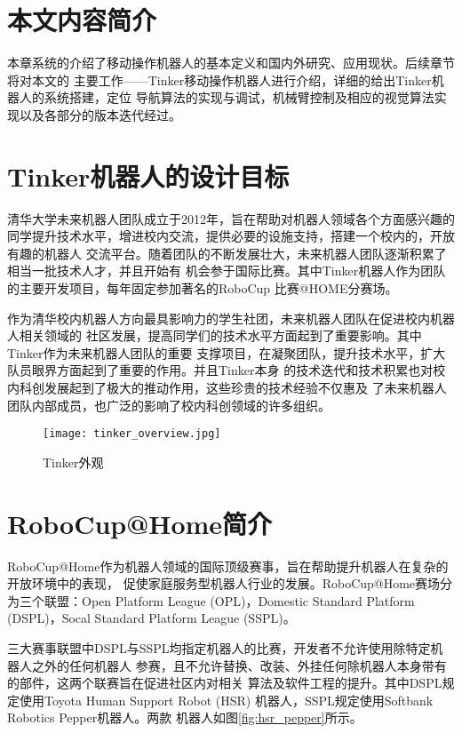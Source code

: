 \section{本文内容简介}

本章系统的介绍了移动操作机器人的基本定义和国内外研究、应用现状。后续章节将对本文的
主要工作——Tinker移动操作机器人进行介绍，详细的给出Tinker机器人的系统搭建，定位
导航算法的实现与调试，机械臂控制及相应的视觉算法实现以及各部分的版本迭代经过。

\iffalse
\section{Tinker机器人的设计目标}

清华大学未来机器人团队成立于2012年，旨在帮助对机器人领域各个方面感兴趣的
同学提升技术水平，增进校内交流，提供必要的设施支持，搭建一个校内的，开放有趣的机器人
交流平台。随着团队的不断发展壮大，未来机器人团队逐渐积累了相当一批技术人才，并且开始有
机会参于国际比赛。其中Tinker机器人作为团队的主要开发项目，每年固定参加著名的RoboCup
比赛@HOME分赛场\cite{wisspeintner2009robocup}。

作为清华校内机器人方向最具影响力的学生社团，未来机器人团队在促进校内机器人相关领域的
社区发展，提高同学们的技术水平方面起到了重要影响。其中Tinker作为未来机器人团队的重要
支撑项目，在凝聚团队，提升技术水平，扩大队员眼界方面起到了重要的作用。并且Tinker本身
的技术迭代和技术积累也对校内科创发展起到了极大的推动作用，这些珍贵的技术经验不仅惠及
了未来机器人团队内部成员，也广泛的影响了校内科创领域的许多组织。

\begin{figure}
  \centering
  \texttt{[image: tinker\_overview.jpg]}
  \caption{Tinker外观}
  \label{fig:tinker_overview}
\end{figure}


\section{RoboCup@Home简介}

RoboCup@Home作为机器人领域的国际顶级赛事，旨在帮助提升机器人在复杂的开放环境中的表现，
促使家庭服务型机器人行业的发展。RoboCup@Home赛场分为三个联盟：Open Platform League
(OPL)，Domestic Standard Platform (DSPL)，Socal Standard Platform League
 (SSPL)。

三大赛事联盟中DSPL与SSPL均指定机器人的比赛，开发者不允许使用除特定机器人之外的任何机器人
参赛，且不允许替换、改装、外挂任何除机器人本身带有的部件，这两个联赛旨在促进社区内对相关
算法及软件工程的提升。其中DSPL规定使用Toyota Human Support Robot (HSR)\cite{toyota_hsr}
机器人，SSPL规定使用Softbank Robotics Pepper\cite{pandey2018mass}机器人。两款
机器人如图\ref{fig:hsr_pepper}所示。


